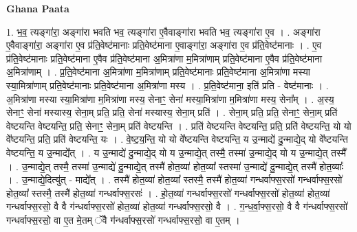 \documentclass[17pt]{extarticle}
\begin{document}
\textbf{Ghana Paata } \newline

1. भ॒व॒ त्यङ्गा॑रा॒ अङ्गा॑रा भवति भव॒ त्यङ्गा॑रा ए॒वैवाङ्गा॑रा भवति भव॒ त्यङ्गा॑रा ए॒व । . अङ्गा॑रा ए॒वैवाङ्गा॑रा॒ अङ्गा॑रा ए॒व प्र॑ति॒वेष्ट॑मानाः प्रति॒वेष्ट॑माना ए॒वाङ्गा॑रा॒ अङ्गा॑रा ए॒व प्र॑ति॒वेष्ट॑मानाः । . ए॒व प्र॑ति॒वेष्ट॑मानाः प्रति॒वेष्ट॑माना ए॒वैव प्र॑ति॒वेष्ट॑माना अ॒मित्रा॑णा म॒मित्रा॑णाम् प्रति॒वेष्ट॑माना ए॒वैव प्र॑ति॒वेष्ट॑माना अ॒मित्रा॑णाम् । . प्र॒ति॒वेष्ट॑माना अ॒मित्रा॑णा म॒मित्रा॑णाम् प्रति॒वेष्ट॑मानाः प्रति॒वेष्ट॑माना अ॒मित्रा॑णा मस्या स्या॒मित्रा॑णाम् प्रति॒वेष्ट॑मानाः प्रति॒वेष्ट॑माना अ॒मित्रा॑णा मस्य । . प्र॒ति॒वेष्ट॑माना॒ इति॑ प्रति - वेष्ट॑मानाः । . अ॒मित्रा॑णा मस्या स्या॒मित्रा॑णा म॒मित्रा॑णा मस्य॒ सेनाꣳ॒॒ सेना॑ मस्या॒मित्रा॑णा म॒मित्रा॑णा मस्य॒ सेना᳚म् । . अ॒स्य॒ सेनाꣳ॒॒ सेना॑ मस्यास्य॒ सेना॒म् प्रति॒ प्रति॒ सेना॑ मस्यास्य॒ सेना॒म् प्रति॑ । . सेना॒म् प्रति॒ प्रति॒ सेनाꣳ॒॒ सेना॒म् प्रति॑ वेष्टयन्ति वेष्टयन्ति॒ प्रति॒ सेनाꣳ॒॒ सेना॒म् प्रति॑ वेष्टयन्ति । . प्रति॑ वेष्टयन्ति वेष्टयन्ति॒ प्रति॒ प्रति॑ वेष्टयन्ति॒ यो यो वे᳚ष्टयन्ति॒ प्रति॒ प्रति॑ वेष्टयन्ति॒ यः । . वे॒ष्ट॒य॒न्ति॒ यो यो वे᳚ष्टयन्ति वेष्टयन्ति॒ य उ॒न्माद्ये॑ दु॒न्माद्ये॒द् यो वे᳚ष्टयन्ति वेष्टयन्ति॒ य उ॒न्माद्ये᳚त् । . य उ॒न्माद्ये॑ दु॒न्माद्ये॒द् यो य उ॒न्माद्ये॒त् तस्मै॒ तस्मा॑ उ॒न्माद्ये॒द् यो य उ॒न्माद्ये॒त् तस्मै᳚ । . उ॒न्माद्ये॒त् तस्मै॒ तस्मा॑ उ॒न्माद्ये॑ दु॒न्माद्ये॒त् तस्मै॑ होत॒व्या॑ होत॒व्या᳚ स्तस्मा॑ उ॒न्माद्ये॑ दु॒न्माद्ये॒त् तस्मै॑ होत॒व्याः᳚ । . उ॒न्माद्ये॒दित्यु॑त् - माद्ये᳚त् । . तस्मै॑ होत॒व्या॑ होत॒व्या᳚ स्तस्मै॒ तस्मै॑ होत॒व्या॑ गन्धर्वाफ्स॒रसो॑ गन्धर्वाफ्स॒रसो॑ होत॒व्या᳚ स्तस्मै॒ तस्मै॑ होत॒व्या॑ गन्धर्वाफ्स॒रसः॑ । . हो॒त॒व्या॑ गन्धर्वाफ्स॒रसो॑ गन्धर्वाफ्स॒रसो॑ होत॒व्या॑ होत॒व्या॑ गन्धर्वाफ्स॒रसो॒ वै वै ग॑न्धर्वाफ्स॒रसो॑ होत॒व्या॑ होत॒व्या॑ गन्धर्वाफ्स॒रसो॒ वै । . ग॒न्ध॒र्वा॒फ्स॒रसो॒ वै वै ग॑न्धर्वाफ्स॒रसो॑ गन्धर्वाफ्स॒रसो॒ वा ए॒त मे॒तम् ॅवै ग॑न्धर्वाफ्स॒रसो॑ गन्धर्वाफ्स॒रसो॒ वा ए॒तम् । \newline
\end{document}
